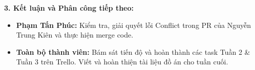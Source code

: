 \documentclass[12pt,a4paper]{article}
\begin{document}
\vspace{2pt}
\textbf{3. Kết luận và Phân công tiếp theo:}
\begin{itemize}
    \item \textbf{Phạm Tấn Phúc:} Kiểm tra, giải quyết lỗi Conflict trong PR của Nguyễn Trung Kiên và thực hiện merge code.
    \item \textbf{Toàn bộ thành viên:} Bám sát tiến độ và hoàn thành các task Tuần 2 \& Tuần 3 trên Trello. Viết và hoàn thiện tài liệu đồ án cho tuần cuối.
\end{itemize}

\label{LastPageMeetingMinute} 
\end{document}
